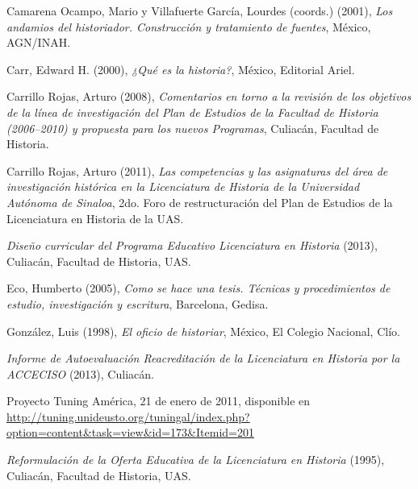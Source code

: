\begin{sloppypar}
Camarena Ocampo, Mario y Villafuerte García, Lourdes (coords.) (2001),
\textit{Los andamios del historiador. Construcción y tratamiento de
fuentes}, México, AGN\slash{}INAH\@.
\end{sloppypar}

Carr, Edward H. (2000), \textit{¿Qué es la historia?}, México, Editorial Ariel.

Carrillo Rojas, Arturo (2008), \textit{Comentarios en torno a la 
revisión de los objetivos de la línea de investigación del Plan de 
Estudios de la Facultad de Historia (2006--2010) y propuesta  para los 
nuevos Programas}, Culiacán, Facultad de Historia. 

Carrillo Rojas, Arturo (2011), \textit{Las competencias y las 
asignaturas del área de investigación histórica en la Licenciatura de 
Historia de la Universidad Autónoma de Sinaloa}, 2do. Foro de 
restructuración del Plan de Estudios de la Licenciatura en Historia de 
la UAS\@.

\textit{Diseño curricular del Programa Educativo Licenciatura en Historia}
(2013), Culiacán, Facultad de Historia, UAS\@.

Eco, Humberto (2005), \textit{Como se hace una tesis. Técnicas y
procedimientos de estudio, investigación y escritura}, Barcelona, Gedisa.

González, Luis (1998), \textit{El oficio de historiar}, México, El Colegio
Nacional, Clío.

\textit{Informe de Autoevaluación Reacreditación de la Licenciatura en
Historia por la ACCECISO} (2013), Culiacán.

\begin{sloppypar}
Proyecto Tuning América, 21 de enero de 2011, disponible en \\ 
\url{http://tuning.unideusto.org/tuningal/index.php?option=content&task=view&id=173&Itemid=201}
\end{sloppypar}

\textit{Reformulación de la Oferta Educativa de la Licenciatura en Historia}
(1995), Culiacán, Facultad de Historia, UAS.

